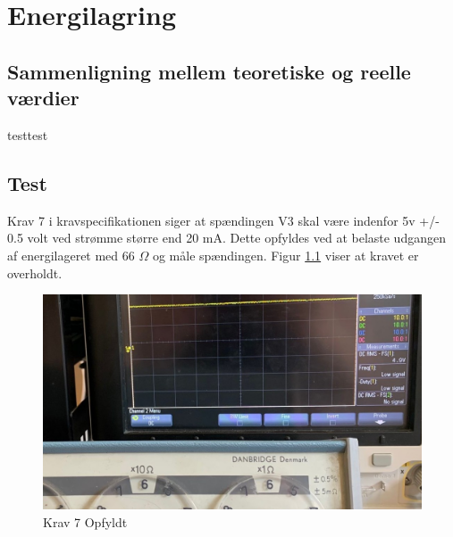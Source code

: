 \documentclass[../main.tex]{subfiles}
\begin{document}
\chapter{Energilagring } \label{Chap:Energilagring}

\section{Sammenligning mellem teoretiske og reelle værdier}
testtest

\section{Test}
Krav 7 i kravspecifikationen siger at spændingen V3 skal være indenfor 5v +/- 0.5 volt ved strømme større end 20 mA. Dette opfyldes ved at belaste udgangen af energilageret med 66 $\Omega$ og måle spændingen. Figur \ref{fig: Krav 7 Opfyldt} viser at kravet er overholdt.

\begin{figure}[H]
      \includegraphics[width=\textwidth]{Dokumentation/Pictures/Krav7.jpg}
     \caption{Krav 7 Opfyldt}
     \label{fig: Krav 7 Opfyldt}
     \end{figure}
\end{document}
